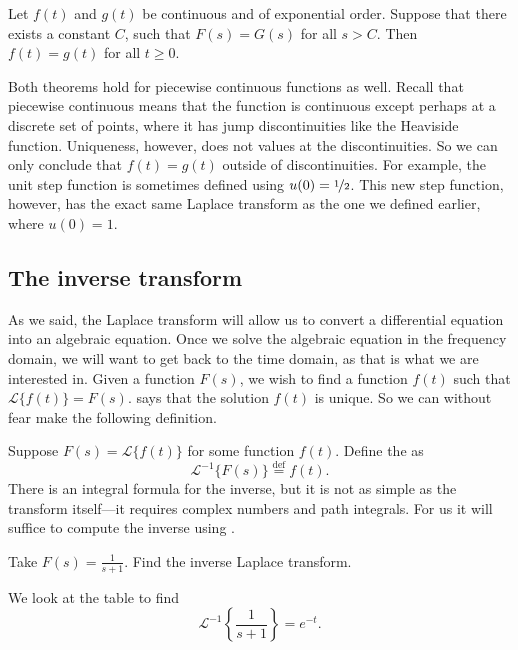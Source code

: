 \begin{theorem}[Uniqueness] \label{lt:uniqthm}
Let $f(t)$ and $g(t)$ be continuous and of exponential order.
Suppose that there exists a constant $C$,
such that $F(s) = G(s)$ for all $s > C$.
Then $f(t) = g(t)$ for all $t \geq 0$.
\end{theorem}

Both theorems hold for piecewise continuous functions as well.
Recall that piecewise continuous means that the function
is continuous except perhaps at a discrete set of points, where it has jump
discontinuities like the Heaviside function.  Uniqueness, however, does
not  values at the discontinuities.  So we can only conclude that
$f(t) = g(t)$ outside of discontinuities.  For example, the unit step
function is sometimes defined using $u(0) = \nicefrac{1}{2}$.  This new
step function, however, has the exact same Laplace transform
as the one we defined earlier, where $u(0) = 1$.

\subsection{The inverse transform}

As we said, the Laplace transform will allow us to convert a differential
equation into an algebraic equation.  Once we solve the
algebraic equation in the frequency domain, we will want to get back to the
time domain, as that is what we are interested in.
Given a function
$F(s)$, we wish to find a function
$f(t)$ such that $\mathcal{L} \bigl\{ f(t) \bigr\} = F(s)$.
 says that the solution $f(t)$ is unique.
So we can without fear make the following definition.

Suppose $F(s) = \mathcal{L} \bigl\{ f(t) \bigr\}$ for some function $f(t)$.
Define the
\emph{} as
\begin{equation*}
{\mathcal{L}}^{-1} \bigl\{ F(s) \bigr\} \overset{\text{def}}{=} f(t) .
\end{equation*}
There is an integral formula for the inverse, but it is not as simple
as the transform itself---it requires complex numbers and path integrals.
For us it will
suffice to
compute the inverse using .

\begin{example}
Take
$F(s) = \frac{1}{s+1}$.  Find the inverse Laplace transform.

We look at the table to find
\begin{equation*}
{\mathcal{L}}^{-1} \left\{ \frac{1}{s+1} \right\} = 
e^{-t} .
\end{equation*}
\end{example}

